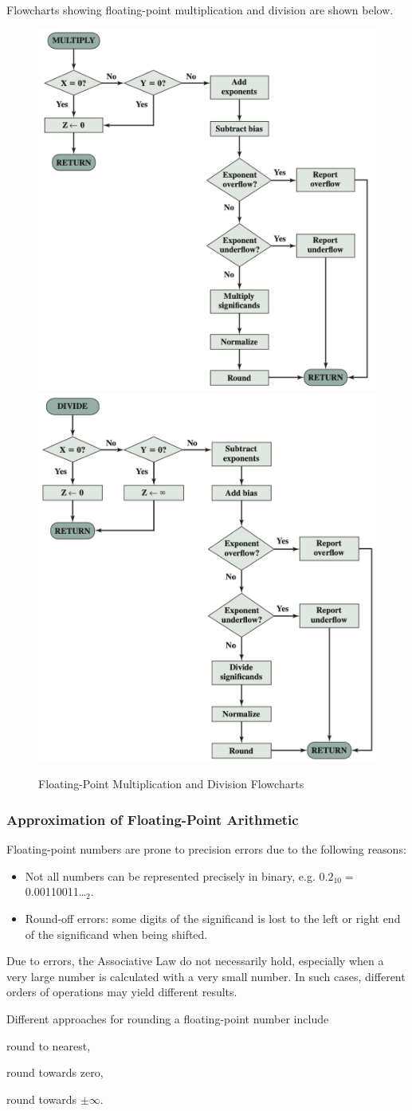 Flowcharts showing floating-point multiplication and division are shown below.

\begin{figure}[H]
    \centering
    \includegraphics[width=0.45\linewidth]{chaps/number-representation/flt-multiply-flowchart.png}
    \includegraphics[width=0.45\linewidth]{chaps/number-representation/flt-divide-flowchart.png}
    \caption{Floating-Point Multiplication and Division Flowcharts}
\end{figure}

\subsubsection{Approximation of Floating-Point Arithmetic}

Floating-point numbers are prone to precision errors due to the following reasons:
\begin{itemize}
    \item Not all numbers can be represented precisely in binary,
        e.g. $0.2_{10} = $0.00110011\ldots$_2$.
    \item Round-off errors: some digits of the significand is lost to the left or right end
        of the significand when being shifted.
\end{itemize}

Due to errors, the Associative Law do not necessarily hold, especially when a very large number
is calculated with a very small number. In such cases, different orders of operations may yield
different results.

Different approaches for rounding a floating-point number include
\begin{enumerate*}
    \item round to nearest,
    \item round towards zero,
    \item round towards $\pm\infty$.
\end{enumerate*}